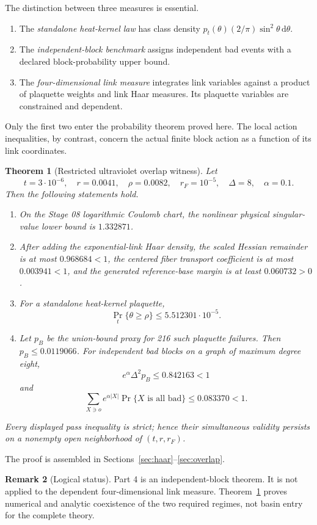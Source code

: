 \documentclass[11pt]{article}
\newtheorem{theorem}{Theorem}[section]
\theoremstyle{definition}
\newtheorem{remark}[theorem]{Remark}
\newcommand{\dd}{\,\mathrm{d}}
\begin{document}
The distinction between three measures is essential.
\begin{enumerate}
\item The \emph{standalone heat-kernel law} has class density
  $p_t(\theta)(2/\pi)\sin^2\theta\dd\theta$.
\item The \emph{independent-block benchmark} assigns independent bad events
  with a declared block-probability upper bound.
\item The \emph{four-dimensional link measure} integrates link variables
  against a product of plaquette weights and link Haar measures.  Its
  plaquette variables are constrained and dependent.
\end{enumerate}
Only the first two enter the probability theorem proved here.  The local
action inequalities, by contrast, concern the actual finite block action as
a function of its link coordinates.

\begin{theorem}[Restricted ultraviolet overlap witness]\label{thm:main}
Let
\[
 t=3\cdot10^{-6},\quad r=0.0041,\quad \rho=0.0082,
 \quad r_F=10^{-5},\quad \Delta=8,\quad \alpha=0.1.
\]
Then the following statements hold.
\begin{enumerate}
\item On the Stage 08 logarithmic Coulomb chart, the nonlinear physical
  singular-value lower bound is $1.332871$.
\item After adding the exponential-link Haar density, the scaled Hessian
  remainder is at most $0.968684<1$, the centered fiber transport coefficient
  is at most $0.003941<1$, and the generated reference-base margin is at
  least $0.060732>0$.
\item For a standalone heat-kernel plaquette,
  \[
    \Pr_t\{\theta\ge\rho\}\le 5.512301\cdot10^{-5}.
  \]
\item Let $p_B$ be the union-bound proxy for 216 such plaquette failures.
  Then $p_B\le0.0119066$.  For independent bad blocks on a graph of maximum
  degree eight,
  \[
   e^\alpha\Delta^2p_B\le0.842163<1
  \]
  and
  \[
   \sum_{X\ni o}e^{\alpha|X|}\Pr\{X\text{ is all bad}\}
   \le 0.083370<1.
  \]
\end{enumerate}
Every displayed pass inequality is strict; hence their simultaneous validity
persists on a nonempty open neighborhood of $(t,r,r_F)$.
\end{theorem}

The proof is assembled in Sections~\ref{sec:haar}--\ref{sec:overlap}.

\begin{remark}[Logical status]
Part 4 is an independent-block theorem.  It is not applied to the dependent
four-dimensional link measure.  Theorem~\ref{thm:main} proves numerical and
analytic coexistence of the two required regimes, not basin entry for the
complete theory.
\end{remark}
\end{document}
